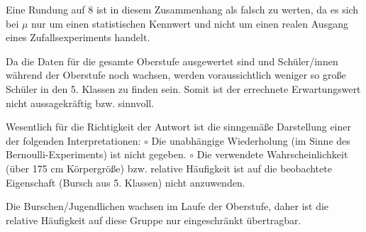 \begin{langesbeispiel}
{\begin{enumerate}
Eine Rundung auf 8 ist in diesem Zusammenhang als falsch zu werten, da
 es sich bei $\mu$ nur um einen statistischen Kennwert und nicht um einen realen Ausgang eines Zufallsexperiments handelt.

Da die Daten für die gesamte Oberstufe ausgewertet sind und Schüler/innen während der Oberstufe noch wachsen, werden voraussichtlich weniger so große Schüler in den 5. Klassen zu finden sein. Somit ist der errechnete Erwartungswert nicht aussagekräftig bzw. sinnvoll.

Wesentlich für die Richtigkeit der Antwort ist die sinngemäße Darstellung einer der folgenden Interpretationen:
\subitem $\circ$ Die unabhängige Wiederholung (im Sinne des Bernoulli-Experiments) ist nicht gegeben.
\subitem $\circ$ Die verwendete Wahrscheinlichkeit (über 175 cm Körpergröße) bzw. relative Häufigkeit ist auf die beobachtete Eigenschaft (Bursch aus 5. Klassen) nicht anzuwenden.

Die Burschen/Jugendlichen wachsen im Laufe der Oberstufe, daher ist die relative Häufigkeit auf diese Gruppe nur eingeschränkt übertragbar.
\end{enumerate}}
\end{langesbeispiel}